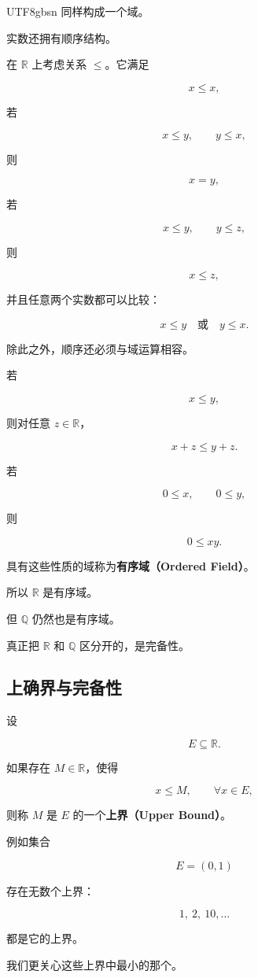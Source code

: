\documentclass[11pt]{article}
\begin{document}
\begin{CJK*}{UTF8}{gbsn}
同样构成一个域。

实数还拥有顺序结构。

在 $\mathbb{R}$ 上考虑关系 $\leq$。它满足

\[
x\leq x,
\]

若

\[
x\leq y,\qquad y\leq x,
\]

则

\[
x=y,
\]

若

\[
x\leq y,\qquad y\leq z,
\]

则

\[
x\leq z,
\]

并且任意两个实数都可以比较：

\[
x\leq y \quad\text{或}\quad y\leq x.
\]

除此之外，顺序还必须与域运算相容。

若

\[
x\leq y,
\]

则对任意 $z\in\mathbb{R}$，

\[
x+z\leq y+z.
\]

若

\[
0\leq x,\qquad0\leq y,
\]

则

\[
0\leq xy.
\]

具有这些性质的域称为\textbf{有序域（Ordered Field）}。

所以 $\mathbb{R}$ 是有序域。

但 $\mathbb{Q}$ 仍然也是有序域。

真正把 $\mathbb{R}$ 和 $\mathbb{Q}$ 区分开的，是完备性。

\subsection{上确界与完备性}

设

\[
E\subseteq\mathbb{R}.
\]

如果存在 $M\in\mathbb{R}$，使得

\[
x\leq M,\qquad\forall x\in E,
\]

则称 $M$ 是 $E$ 的一个\textbf{上界（Upper Bound）}。

例如集合

\[
E=(0,1)
\]

存在无数个上界：

\[
1,\ 2,\ 10,\ldots
\]

都是它的上界。

我们更关心这些上界中最小的那个。


\end{CJK*}
\end{document}
